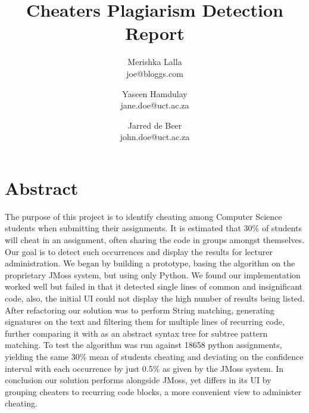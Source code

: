 \documentclass[11pt,a4paper]{article}
\begin{document}
\title{Cheaters Plagiarism Detection Report} \date{}
\author{Merishka Lalla\\joe@bloggs.com
\and Yaseen Hamdulay\\jane.doe@uct.ac.za
\and Jarred de Beer\\john.doe@uct.ac.za}

\chead{}
\lfoot{}
\cfoot{\thepage}    %
\rfoot{}
\renewcommand{\headrulewidth}{0.0pt}   %

\maketitle
\thispagestyle{plain}  %

\section*{Abstract}
The purpose of this project is to identify cheating among Computer Science
students when submitting their assignments. It is estimated that
30\% of students will cheat in an assignment, often sharing the code in groups amongst themselves.
 Our goal is to detect such occurrences and display the results for lecturer administration. 
We began by building a prototype, basing the algorithm on the proprietary JMoss system, 
but using only Python. We found our implementation worked well but failed in that it detected single lines 
of common and insignificant code, also, the initial UI could not display the high number of results
being listed. After refactoring our solution was to perform String matching, generating 
signatures on the text and filtering them for multiple lines of
recurring code, further comparing it with as an abstract syntax tree for subtree pattern matching. 
To test the algorithm was run against 18658 python assignments, yielding the same 30\% mean
of students cheating and deviating on the confidence interval with each occurrence by just 0.5\%
as given by the JMoss system. In conclusion our solution performs alongside JMoss, yet differs in its UI by
grouping cheaters to recurring code blocks, a more convenient view to administer cheating.
\end{document}
